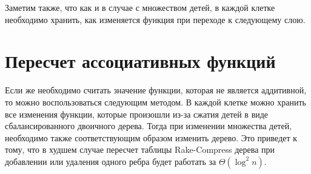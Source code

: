 Заметим также, что как и в случае с множеством детей, в каждой клетке необходимо хранить, как изменяется функция при переходе к следующему слою.

\FloatBarrier
\section{Пересчет ассоциативных функций}

Если же необходимо считать значение функции, которая не является аддитивной, то можно воспользоваться следующим методом.
В каждой клетке можно хранить все изменения функции, которые произошли из-за сжатия детей в виде сбалансированного двоичного дерева. 
Тогда при изменении множества детей, необходимо также соответствующим образом изменить дерево. 
Это приведет к тому, что в худшем случае пересчет таблицы Rake-Compress дерева при добавлении или удаления одного ребра будет работать за $\Theta(\log^2 n)$.



